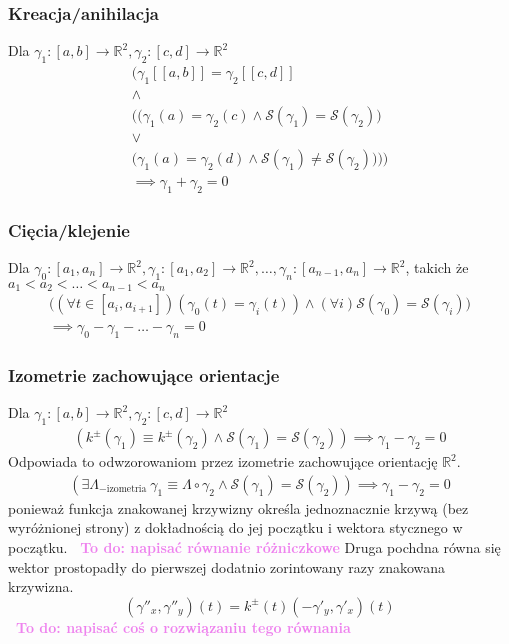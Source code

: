 \documentclass[a4paper, 12pt]{article}
\newcommand{\smalltodoII}[1]{\hfill \break \textbf{\ \textcolor{violet}{To do: #1}}\hfill \break}
\begin{document}
\subsubsection{Kreacja/anihilacja}
Dla $\gamma_1 : [a, b] \to \mathbb{R}^2, \gamma_2 : [c, d] \to \mathbb{R}^2$
\begin{gather}
    \Big( \gamma_1[[a,b]]=\gamma_2[[c,d]] \\\land\\
    \big( (\gamma_1(a) = \gamma_2(c) \land \mathcal{S}(\gamma_1)=\mathcal{S}(\gamma_2)\big) \\\lor \\
    \big(\gamma_1(a) = \gamma_2(d) \land \mathcal{S}(\gamma_1)\neq\mathcal{S}(\gamma_2)) \big) \Big)\\
     \implies \gamma_1 + \gamma_2 = 0
\end{gather}
\subsubsection{Cięcia/klejenie}
Dla $\gamma_0 : [a_1, a_n] \to \mathbb{R}^2, \gamma_1 : [a_1, a_2] \to \mathbb{R}^2, \ldots, \gamma_n :
[a_{n-1}, a_n] \to \mathbb{R}^2$, takich że $a_1 < a_2 < \ldots < a_{n-1} < a_n$
\begin{gather}
    \Big(
    (\forall t \in [a_i, a_{i+1}])(\gamma_0(t)=\gamma_i(t)) \land (\forall i)\mathcal{S}(\gamma_0) =
    \mathcal{S}(\gamma_i)
    \Big) \\
    \implies \gamma_0 - \gamma_1 - \ldots -\gamma_n = 0
\end{gather}
\subsubsection{Izometrie zachowujące orientacje}
Dla $\gamma_1 : [a, b] \to \mathbb{R}^2, \gamma_2 : [c, d] \to \mathbb{R}^2$
\begin{gather}
    ( k^\pm(\gamma_1) \equiv k^\pm(\gamma_2)
    \land
    \mathcal{S}(\gamma_1)=\mathcal{S}(\gamma_2))
    \implies \gamma_1 - \gamma_2 = 0
\end{gather}
Odpowiada to odwzorowaniom przez izometrie zachowujące orientację $\mathbb{R}^2$.
\begin{gather}
    (\exists\Lambda_{-\text{izometria}}\ \gamma_1 \equiv \Lambda\circ\gamma_2
    \land \mathcal{S}(\gamma_1)=\mathcal{S}(\gamma_2))\implies \gamma_1 - \gamma_2 = 0
\end{gather}
ponieważ funkcja znakowanej krzywizny określa jednoznacznie krzywą (bez wyróżnionej strony)
z dokładnością do jej początku i wektora stycznego w początku.
\smalltodoII{napisać równanie różniczkowe}
Druga pochdna równa się wektor prostopadły do pierwszej dodatnio zorintowany razy znakowana krzywizna. \\
\begin{equation}
    (\gamma''_x, \gamma''_y)(t) = k^\pm(t)(-\gamma'_y, \gamma'_x)(t)
\end{equation}
\smalltodoII{napisać coś o rozwiązaniu tego równania}
\end{document}
